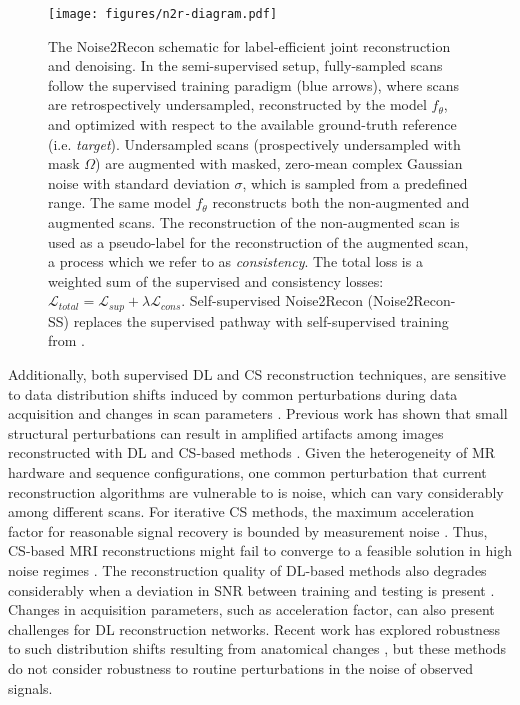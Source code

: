 \documentclass[10pt,twocolumn,letterpaper]{article}
\newcommand{\RV}[1]{{#1}}
\begin{document}
\begin{figure}[ht!]
    \centering
  \begin{center}
      \texttt{[image: figures/n2r-diagram.pdf]}
  \end{center}
  \caption{The Noise2Recon schematic for label-efficient joint reconstruction and denoising. In the semi-supervised setup, fully-sampled scans follow the supervised training paradigm (blue arrows), \RV{where scans are retrospectively undersampled, reconstructed by the model $f_\theta$, and optimized with respect to the available ground-truth reference (i.e. \textit{target})}. Undersampled scans (prospectively undersampled with mask $\Omega$) are augmented with masked, zero-mean complex Gaussian noise with standard deviation $\sigma$, which is sampled from a predefined range. The same model \RV{$f_\theta$} reconstructs both the non-augmented and augmented scans. The reconstruction of the non-augmented scan is used as a pseudo-label for the reconstruction of the augmented scan, a process which we refer to as \textit{consistency}. The total loss is a weighted sum of the supervised and consistency losses: $\mathcal{L}_{total} = \mathcal{L}_{sup} + \lambda\mathcal{L}_{cons}$. Self-supervised Noise2Recon (Noise2Recon-SS) replaces the supervised pathway with self-supervised training from \cite{Yaman_self}.}
  \label{fig:n2r-schematic}
\end{figure}

Additionally, both supervised DL and CS reconstruction techniques, are sensitive to data distribution shifts induced by common perturbations during data acquisition and changes in scan parameters \cite{Chaudhari_2021,hammernik2021systematic}. Previous work has shown that small structural perturbations can result in amplified artifacts among images reconstructed with DL and CS-based methods \cite{darestani21a, Lustig_Donoho_Pauly_2007,Antun30088}. Given the heterogeneity of MR hardware and sequence configurations, one common perturbation that current reconstruction algorithms are vulnerable to is noise, which can vary considerably among different scans. For iterative CS methods, the maximum acceleration factor for reasonable signal recovery is bounded by measurement noise \cite{Donoho_Maleki_Montanari_2011}. Thus, CS-based MRI reconstructions might fail to converge to a feasible solution in high noise regimes \cite{Virtue_Lustig_2017}. The reconstruction quality of DL-based methods also degrades considerably when a deviation in SNR between training and testing is present \cite{Knoll2019b}. Changes in acquisition parameters, such as acceleration factor, can also present challenges for DL reconstruction networks. Recent work has explored robustness to such distribution shifts resulting from anatomical changes \cite{jalal2021robust,raj2020improving}, but these methods do not consider robustness to routine perturbations in the noise of observed signals.
\end{document}
